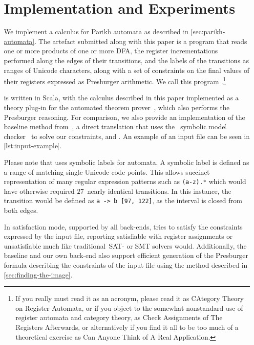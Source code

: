 \documentclass[acmsmall,review,anonymous,screen]{acmart}\settopmatter{printfolios=true,printccs=false,printacmref=true}
\theoremstyle{definition}
\begin{document}
\section{Implementation and Experiments}\label{sec:implementation}

We implement a calculus for Parikh automata as described in
\cref{sec:parikh-automata}. The artefact submitted along with this paper
is a program that reads one or more products of one or more DFA, the register
incrementations performed along the edges of their transitions, and the labels
of the transitions as ranges of Unicode characters, along with a set of
constraints on the final values of their registers expressed as Presburger
arithmetic. We call this program \Catra.\footnote{If you really must read it
as an acronym, please read it as CAtegory Theory on Register Automata, or if you
object to the somewhat nonstandard use of register automata and category theory,
as Check Assignments of The Registers Afterwards, or alternatively if you find it
all to be too much of a theoretical exercise as Can Anyone Think of A Real
Application.}

\Catra{} is written in Scala, with the calculus described in this paper
implemented as a theory plug-in for the \Princess{} automated theorem
prover~\cite{princess}, which also performs the Presburger reasoning. For
comparison, we also provide an implementation of the baseline method
from~\cite{generate-parikh-image}, a direct translation that uses the~\Nuxmv{}
symbolic model checker~\cite{nuxmv} to solve our constraints, and . An example of an input file  can be seen in \cref{lst:input-example}.

Please note that \Catra{} uses symbolic labels for automata. A symbolic label is
defined as a range of matching single Unicode code points. This allows succinct
representation of many regular expression patterns such as \lstinline{(a-z).*}
which would have otherwise required $27$~nearly identical transitions. In this
instance, the transition would be defined as \lstinline{a -> b [97, 122]}, as the
interval is closed from both edges.

In satisfaction mode, supported by all back-ends, \Catra{} tries to satisfy the
constraints expressed by the input file, reporting satisfiable with register
assignments or unsatisfiable much like traditional~SAT- or SMT solvers would.
Additionally, the baseline and our own back-end also support efficient
generation of the Presburger formula describing the constraints of the input
file using the method described in \cref{sec:finding-the-image}.
\end{document}
